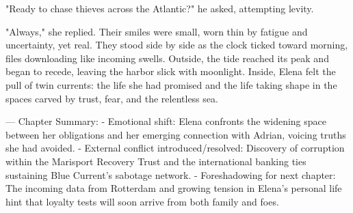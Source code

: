 "Ready to chase thieves across the Atlantic?" he asked, attempting levity.

"Always," she replied. Their smiles were small, worn thin by fatigue and uncertainty, yet real. They stood side by side as the clock ticked toward morning, files downloading like incoming swells. Outside, the tide reached its peak and began to recede, leaving the harbor slick with moonlight. Inside, Elena felt the pull of twin currents: the life she had promised and the life taking shape in the spaces carved by trust, fear, and the relentless sea.

\bigskip

---
Chapter Summary:
- Emotional shift: Elena confronts the widening space between her obligations and her emerging connection with Adrian, voicing truths she had avoided.
- External conflict introduced/resolved: Discovery of corruption within the Marisport Recovery Trust and the international banking ties sustaining Blue Current's sabotage network.
- Foreshadowing for next chapter: The incoming data from Rotterdam and growing tension in Elena's personal life hint that loyalty tests will soon arrive from both family and foes.
